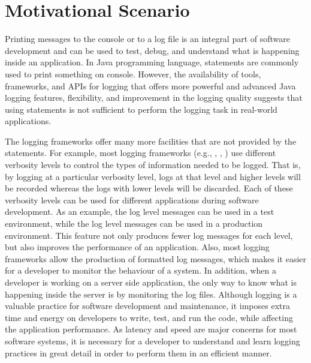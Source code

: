 \chapter{Motivational Scenario}  \label{ch2}

Printing messages to the console or to a log file is an integral part of software development and can be used to test, debug, and understand what is happening inside an application. In Java programming language,  statements are commonly used to print something on console. However, the availability of tools, frameworks, and APIs for logging that offers more powerful and advanced Java logging features, flexibility, and improvement in the logging quality suggests that using  statements is not sufficient to perform the logging task in real-world applications.

The logging frameworks offer many more facilities that are not provided by the  statements. For example, most logging frameworks (e.g., , , ) use different verbosity levels to control the types of information needed to be logged. That is, by logging at a particular verbosity level, logs at that level and higher levels will be recorded whereas the logs with lower levels will be discarded. Each of these verbosity levels can be used for different applications during software development. As an example, the  log level messages can be used in a test environment, while the  log level messages can be used in a production environment. This feature not only produces fewer log messages for each level, but also improves the performance of an application. Also, most logging frameworks allow the production of formatted log messages, which makes it easier for a developer to monitor the behaviour of a system. In addition, when a developer is working on a server side application, the only way to know what is happening inside the server is by monitoring the log files. Although logging is a valuable practice for software development and maintenance, it imposes extra time and energy on developers to write, test, and run the code, while affecting the application performance. As latency and speed are major concerns for most software systems, it is necessary for a developer to understand and learn logging practices in great detail in order to perform them in an efficient manner.

